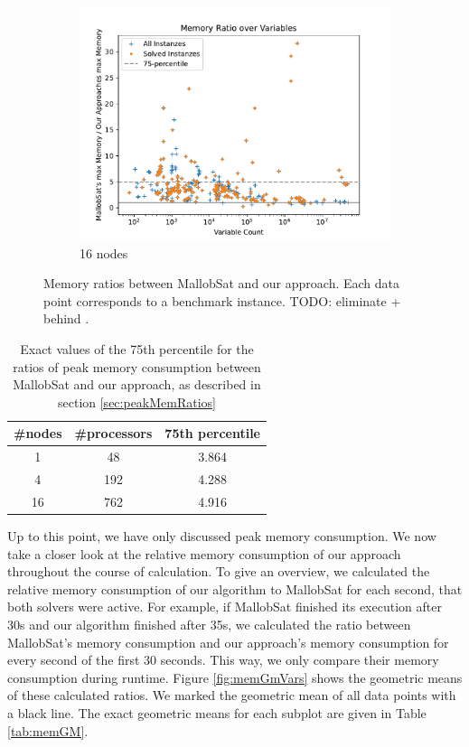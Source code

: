 \documentclass[12pt,a4paper,twoside]{scrartcl}
\numberwithin{equation}{section}
\begin{document}
\begin{figure}
\begin{subfigure}[c]{.45\textwidth}
    \includegraphics[scale=.45]{plots/16node_compare/mem_ratio_over_vars.pdf}
    \caption{16 nodes}
    \label{fig:memRatiosVars16node}
  \end{subfigure}
  \caption{Memory ratios between MallobSat and our approach. Each data point corresponds to a benchmark instance. TODO: eliminate + behind .}
  \label{fig:memRatiosVars}
\end{figure}

\begin{table}
  \center
  \begin{tabular}{ ccc }
    \toprule
    \#nodes & \#processors & 75th percentile \\
    \midrule
    1  & 48  & 3.864\\
    4  & 192 & 4.288\\
    16 & 762 & 4.916\\
    \bottomrule
  \end{tabular}
  \caption{Exact values of the 75th percentile for the ratios of peak memory consumption between MallobSat and our approach, as described in section \ref{sec:peakMemRatios}}
  \label{tab:memRatioPercentiles}
\end{table}

\label{sec:GMs}
Up to this point, we have only discussed peak memory consumption. We now take a closer look at the relative memory consumption of our approach throughout the course of calculation. To give an overview, we calculated the relative memory consumption of our algorithm to MallobSat for each second, that both solvers were active. For example, if MallobSat finished its execution after 30s and our algorithm finished after 35s, we calculated the ratio between MallobSat's memory consumption and our approach's memory consumption for every second of the first 30 seconds. This way, we only compare their memory consumption during runtime. Figure \ref{fig:memGmVars} shows the geometric means of these calculated ratios. We marked the geometric mean of all data points with a black line. The exact geometric means for each subplot are given in Table \ref{tab:memGM}.
\end{document}
